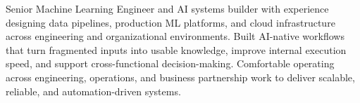 

\begin{cvparagraph}


Senior Machine Learning Engineer and AI systems builder with experience designing data pipelines, production ML platforms, and cloud infrastructure across engineering and organizational environments. Built AI-native workflows that turn fragmented inputs into usable knowledge, improve internal execution speed, and support cross-functional decision-making. Comfortable operating across engineering, operations, and business partnership work to deliver scalable, reliable, and automation-driven systems.
\end{cvparagraph}
